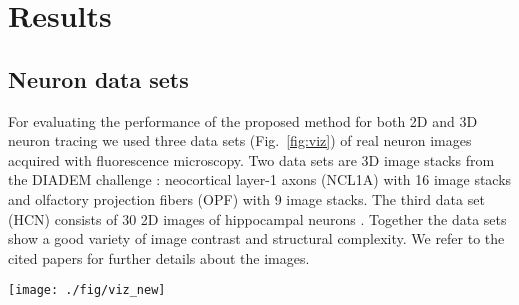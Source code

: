 \section{Results}
\label{sec:results}

\subsection{Neuron data sets} 
\label{subsec:neuron-datasets}
For evaluating the performance of the proposed method for both 2D and 3D neuron tracing we used three data sets (Fig.~\ref{fig:viz}) of real neuron images acquired with fluorescence microscopy. Two data sets are 3D image stacks from the DIADEM challenge \citep{brown2011diadem}: neocortical layer-1 axons (NCL1A) with 16 image stacks and olfactory projection fibers (OPF) with 9 image stacks. The third data set (HCN) consists of 30 2D images of hippocampal neurons \citep{steiner2002overexpression}. Together the data sets show a good variety of image contrast and structural complexity. We refer to the cited papers for further details about the images.

\begin{figure*}[!t]
\centering
\texttt{[image: ./fig/viz\_new]}
\vspace{-1.5\baselineskip}
\caption{Example images with tracing results of the data sets used in the evaluation. Top row: NCL1A image stacks (volume rendered) showing a network of neocortical layer-1 axons. Middle row: OPF image stacks (volume rendered) showing olfactory projection fibers. Bottom row: HCN images showing hippocampal neurons. The tracings (overlaid in red) were obtained with our method using 20 seeds and at most 10 rounds (up to 40 for the top row to capture more detail). For illustration purposes the image intensities are inverted in these visualizations compared to the originals, and the tracings are offset with respect to the neuron structures for better visual comparison.}
\label{fig:viz}
\end{figure*}

